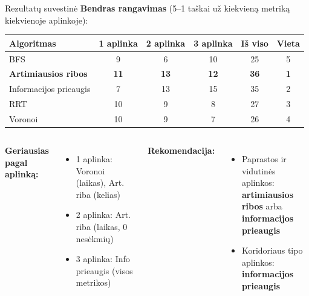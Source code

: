 \documentclass[12pt]{beamer}
\begin{document}
\begin{frame}{Rezultatų suvestinė}
    \textbf{Bendras rangavimas} (5--1 taškai už kiekvieną metriką kiekvienoje aplinkoje):

    \begin{table}
        \centering
        \small
        \begin{tabular}{|l|c|c|c|c|c|}
            \hline
            \textbf{Algoritmas} & \textbf{1 aplinka} & \textbf{2 aplinka} & \textbf{3 aplinka} & \textbf{Iš viso} & \textbf{Vieta} \\
            \hline
            BFS & 9 & 6 & 10 & 25 & 5 \\
            \hline
            \textbf{Artimiausios ribos} & \textbf{11} & \textbf{13} & \textbf{12} & \textbf{36} & \textbf{1} \\
            \hline
            Informacijos prieaugis & 7 & 13 & 15 & 35 & 2 \\
            \hline
            RRT & 10 & 9 & 8 & 27 & 3 \\
            \hline
            Voronoi & 10 & 9 & 7 & 26 & 4 \\
            \hline
        \end{tabular}
    \end{table}

    \vspace{0.2cm}
    \begin{columns}[onlytextwidth]
        \textbf{Geriausias pagal aplinką:}
        \begin{itemize}
            \item 1 aplinka: Voronoi (laikas), Art. riba (kelias)
            \item 2 aplinka: Art. riba (laikas, 0 nesėkmių)
            \item 3 aplinka: Info prieaugis (visos metrikos)
        \end{itemize}
        \textbf{Rekomendacija:}
        \begin{itemize}
            \item Paprastos ir vidutinės aplinkos:\\
                  \textbf{artimiausios ribos} arba \textbf{informacijos prieaugis}
            \item Koridoriaus tipo aplinkos:\\
                  \textbf{informacijos prieaugis}
        \end{itemize}
    \end{columns}
\end{frame}
\end{document}
